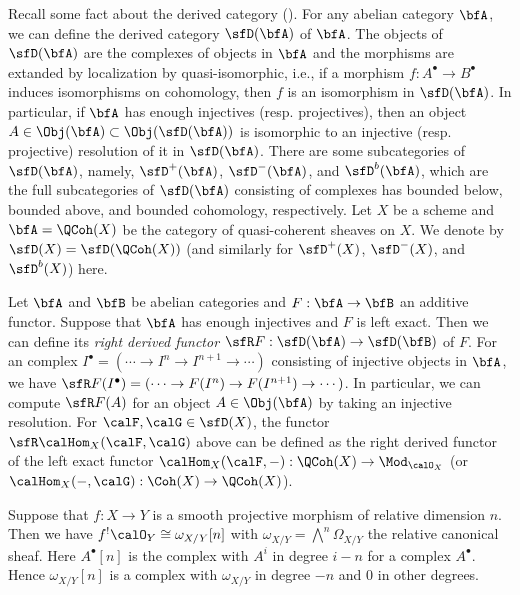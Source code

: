 \begin{remark}
	Recall some fact about the derived category (\cite[Tag \href{https://stacks.math.columbia.edu/tag/05QI}{05QI}]{Stacks}).
	For any abelian category $\bfA$, we can define the derived category $\sfD(\bfA)$ of $\bfA$.
	The objects of $\sfD(\bfA)$ are the complexes of objects in $\bfA$ and the morphisms are extanded by localization by quasi-isomorphic, i.e., if a morphism $f: A^\bullet \to B^\bullet$ induces isomorphisms on cohomology, then $f$ is an isomorphism in $\sfD(\bfA)$.
	In particular, if $\bfA$ has enough injectives (resp. projectives), then an object $A \in \Obj(\bfA) \subset \Obj(\sfD(\bfA))$ is isomorphic to an injective (resp. projective) resolution of it in $\sfD(\bfA)$.
	There are some subcategories of $\sfD(\bfA)$, namely, $\sfD^+(\bfA)$, $\sfD^-(\bfA)$, and $\sfD^b(\bfA)$, which are the full subcategories of $\sfD(\bfA)$ consisting of complexes has bounded below, bounded above, and bounded cohomology, respectively.
	Let $X$ be a scheme and $\bfA = \QCoh(X)$ be the category of quasi-coherent sheaves on $X$.
	We denote by $\sfD(X) = \sfD(\QCoh(X))$ (and similarly for $\sfD^+(X)$, $\sfD^-(X)$, and $\sfD^b(X)$) here.

	Let $\bfA$ and $\bfB$ be abelian categories and $F: \bfA \to \bfB$ an additive functor.
	Suppose that $\bfA$ has enough injectives and $F$ is left exact.
	Then we can define its \emph{right derived functor} $\sfR F: \sfD(\bfA) \to \sfD(\bfB)$ of $F$.
	For an complex $I^\bullet = (\cdots \to I^n \to I^{n+1} \to \cdots)$ consisting of injective objects in $\bfA$, we have $\sfR F(I^\bullet) = (\cdots \to F(I^n) \to F(I^{n+1}) \to \cdots)$.
	In particular, we can compute $\sfR F(A)$ for an object $A \in \Obj(\bfA)$ by taking an injective resolution.
	For $\calF, \calG \in \sfD(X)$, the functor $\sfR \calHom_X(\calF, \calG)$ above can be defined as the right derived functor of the left exact functor $\calHom_X(\calF, -): \QCoh(X) \to \Mod_{\calO_X}$ (or $\calHom_X(-, \calG): \Coh(X) \to \QCoh(X)$).
\end{remark}

\begin{example}
	Suppose that $f: X \to Y$ is a smooth projective morphism of relative dimension $n$.
	Then we have $f^!\calO_Y \cong \omega_{X/Y}[n]$ with $\omega_{X/Y} = \bigwedge^n \Omega_{X/Y}$ the relative canonical sheaf.
	Here $A^\bullet[n]$ is the complex with $A^i$ in degree $i-n$ for a complex $A^\bullet$.
	Hence $\omega_{X/Y}[n]$ is a complex with $\omega_{X/Y}$ in degree $-n$ and $0$ in other degrees.
	\Yang{}
\end{example}

